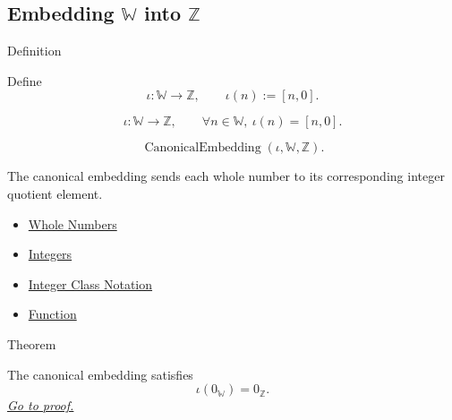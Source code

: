 \subsection*{\texorpdfstring{Embedding $\mathbb{W}$ into $\mathbb{Z}$}{Embedding W into Z}}

\begin{definitionbox}{Definition}
\begin{definition}
\label{def:canonical-embedding-w-into-z}
Define
\[
\iota:\mathbb{W}\to\mathbb{Z},
\qquad
\iota(n):=[n,0].
\]
\end{definition}
\end{definitionbox}

\begin{remark*}
\[
\iota:\mathbb{W}\to\mathbb{Z},
\qquad
\forall n\in\mathbb{W},\ \iota(n)=[n,0].
\]
\end{remark*}

\begin{remark*}
\[
\operatorname{CanonicalEmbedding}(\iota,\mathbb{W},\mathbb{Z}).
\]
\end{remark*}

\begin{remark*}[Interpretation]
The canonical embedding sends each whole number to its corresponding integer
quotient element.
\end{remark*}

\begin{dependencies}
\begin{itemize}
  \item \hyperref[def:whole-numbers]{Whole Numbers}
  \item \hyperref[def:integers]{Integers}
  \item \hyperref[def:integer-class-notation]{Integer Class Notation}
  \item \hyperref[def:function]{Function}
\end{itemize}
\end{dependencies}

\begin{theorembox}{Theorem}
\begin{theorem}
\label{thm:embedding-w-into-z-preserves-zero}
The canonical embedding satisfies
\[
\iota(0_{\mathbb{W}})=0_{\mathbb{Z}}.
\]
\hyperref[prf:embedding-w-into-z-preserves-zero]{\textit{Go to proof.}}
\end{theorem}
\end{theorembox}

